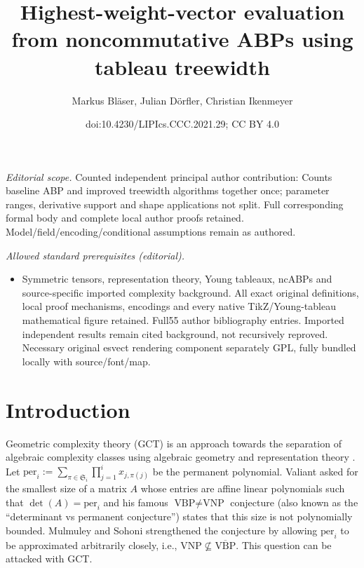 \documentclass[10pt,a4paper]{article}
\title{Highest-weight-vector evaluation from noncommutative ABPs using tableau treewidth}
\author{Markus Bläser, Julian Dörfler, Christian Ikenmeyer}
\date{doi:10.4230/LIPIcs.CCC.2021.29; CC BY 4.0}
\numberwithin{equation}{section}
\theoremstyle{definition}
\newcommand{\aS}{\mathfrak{S}}
\newcommand{\per}{\text{per}}
\begin{document}
\maketitle
\noindent\textit{Editorial scope.} Counted independent principal author contribution: Counts baseline ABP and improved treewidth algorithms together once; parameter ranges, derivative support and shape applications not split. Full corresponding formal body and complete local author proofs retained. Model/field/encoding/conditional assumptions remain as authored.\par\medskip
\noindent\textit{Allowed standard prerequisites (editorial).}\begin{itemize}
\item Symmetric tensors, representation theory, Young tableaux, ncABPs and source-specific imported complexity background. All exact original definitions, local proof mechanisms, encodings and every native TikZ/Young-tableau mathematical figure retained. Full55 author bibliography entries. Imported independent results remain cited background, not recursively reproved. Necessary original esvect rendering component separately GPL, fully bundled locally with source/font/map.
\end{itemize}\medskip
\section{Introduction}
\label{sec:intro}
Geometric complexity theory (GCT) is an approach towards the separation of algebraic complexity classes using algebraic geometry and representation theory \cite{gct1, gct2, BLMW:11}.
Let $\per_i := \sum_{\pi\in\aS_i} \prod_{j=1}^i x_{j,\pi(j)}$ be the permanent polynomial. Valiant 
asked for the smallest size of a matrix $A$ whose entries are affine linear polynomials such that $\det(A)=\per_i$ and his famous $\text{VBP}\neq\text{VNP}$ conjecture (also known as the ``determinant vs permanent conjecture'') states that this size is not polynomially bounded.
%
%
%
Mulmuley and Sohoni strengthened the conjecture by allowing $\per_i$ to be approximated arbitrarily closely, i.e., $\text{VNP}\not\subseteq\overline{\text{VBP}}$.
This question can be attacked with GCT.
\end{document}

